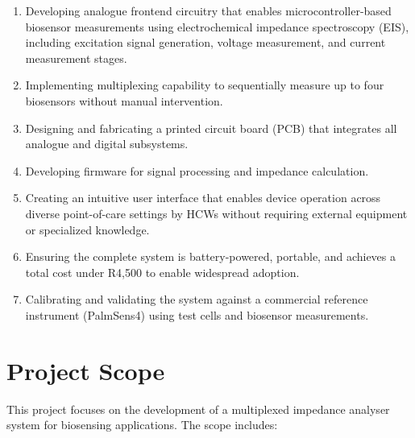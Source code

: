 \begin{enumerate}
    \item Developing analogue frontend circuitry that enables microcontroller-based biosensor measurements using electrochemical impedance spectroscopy (EIS), including excitation signal generation, voltage measurement, and current measurement stages.
    \item Implementing multiplexing capability to sequentially measure up to four biosensors without manual intervention.
    \item Designing and fabricating a printed circuit board (PCB) that integrates all analogue and digital subsystems.
    \item Developing firmware for signal processing and impedance calculation.
    \item Creating an intuitive user interface that enables device operation across diverse point-of-care settings by \acp{HCW} without requiring external equipment or specialized knowledge.
    \item Ensuring the complete system is battery-powered, portable, and achieves a total cost under R4,500 to enable widespread adoption.
    \item Calibrating and validating the system against a commercial reference instrument (PalmSens4) using test cells and biosensor measurements.
\end{enumerate}

\section{Project Scope}

This project focuses on the development of a multiplexed impedance analyser system for biosensing applications. The scope includes:

